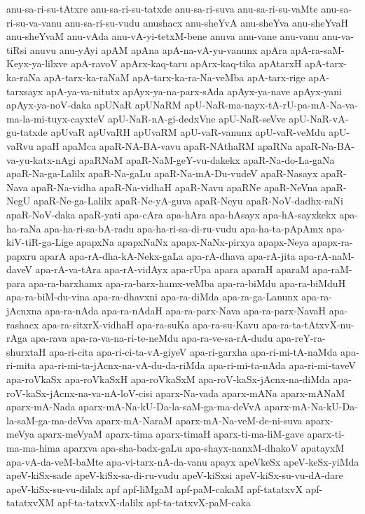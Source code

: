 {anu-sa-ri-su-tAtxre
anu-sa-ri-su-tatxde
anu-sa-ri-suva
anu-sa-ri-su-vaMte
anu-sa-ri-su-va-vanu
anu-sa-ri-su-vudu
anushacx
anu-sheYvA
anu-sheYva
anu-sheYvaH
anu-sheYvaM
anu-vAda
anu-vA-yi-tetxM-bene
anuva
anu-vane
anu-vanu
anu-va-tiRsi
anuvu
anu-yAyi
apAM
apAna
apA-na-vA-yu-vanunx
apAra
apA-ra-saM-Keyx-ya-lilxve
apA-ravoV
apArx-kaq-taru
apArx-kaq-tika
apAtarxH
apA-tarx-ka-raNa
apA-tarx-ka-raNaM
apA-tarx-ka-ra-Na-veMba
apA-tarx-rige
apA-tarxsayx
apA-ya-va-nitutx
apAyx-ya-na-parx-sAda
apAyx-ya-nave
apAyx-yani
apAyx-ya-noV-daka
apUNaR
apUNaRM
apU-NaR-ma-nayx-tA-rU-pa-mA-Na-va-ma-la-mi-tuyx-cayxteV
apU-NaR-nA-gi-dedxVne
apU-NaR-seVve
apU-NaR-vA-gu-tatxde
apUvaR
apUvaRH
apUvaRM
apU-vaR-vanunx
apU-vaR-veMdu
apU-vaRvu
apaH
apaMca
apaR-NA-BA-vavu
apaR-NAthaRM
apaRNa
apaR-Na-BA-va-yu-katx-nAgi
apaRNaM
apaR-NaM-geY-vu-dakekx
apaR-Na-do-La-gaNa
apaR-Na-ga-Lalilx
apaR-Na-gaLu
apaR-Na-mA-Du-vudeV
apaR-Nasayx
apaR-Nava
apaR-Na-vidha
apaR-Na-vidhaH
apaR-Navu
apaRNe
apaR-NeVna
apaR-NegU
apaR-Ne-ga-Lalilx
apaR-Ne-yA-guva
apaR-Neyu
apaR-NoV-dadhx-raNi
apaR-NoV-daka
apaR-yati
apa-cAra
apa-hAra
apa-hAsayx
apa-hA-sayxkekx
apa-ha-raNa
apa-ha-ri-sa-bA-radu
apa-ha-ri-sa-di-ru-vudu
apa-ha-ta-pApAmx
apa-kiV-tiR-ga-Lige
apapxNa
apapxNaNx
apapx-NaNx-pirxya
apapx-Neya
apapx-ra-papxru
aparA
apa-rA-dha-kA-Nekx-gaLa
apa-rA-dhava
apa-rA-jita
apa-rA-naM-daveV
apa-rA-va-tAra
apa-rA-vidAyx
apa-rUpa
apara
aparaH
aparaM
apa-raM-para
apa-ra-barxhamx
apa-ra-barx-hamx-veMba
apa-ra-biMdu
apa-ra-biMduH
apa-ra-biM-du-vina
apa-ra-dhavxni
apa-ra-diMda
apa-ra-ga-Lanunx
apa-ra-jAcnxna
apa-ra-nAda
apa-ra-nAdaH
apa-ra-parx-Nava
apa-ra-parx-NavaH
apa-rashacx
apa-ra-sitxrX-vidhaH
apa-ra-suKa
apa-ra-su-Kavu
apa-ra-ta-tAtxvX-nu-rAga
apa-rava
apa-ra-va-na-ri-te-neMdu
apa-ra-ve-sa-rA-dudu
apa-reY-ra-shurxtaH
apa-ri-cita
apa-ri-ci-ta-vA-giyeV
apa-ri-garxha
apa-ri-mi-tA-naMda
apa-ri-mita
apa-ri-mi-ta-jAcnx-na-vA-du-da-riMda
apa-ri-mi-ta-nAda
apa-ri-mi-taveV
apa-roVkaSx
apa-roVkaSxH
apa-roVkaSxM
apa-roV-kaSx-jAcnx-na-diMda
apa-roV-kaSx-jAcnx-na-va-nA-loV-cisi
aparx-Na-vada
aparx-mANa
aparx-mANaM
aparx-mA-Nada
aparx-mA-Na-kU-Da-la-saM-ga-ma-deVvA
aparx-mA-Na-kU-Da-la-saM-ga-ma-deVva
aparx-mA-NaraM
aparx-mA-Na-veM-de-ni-suva
aparx-meVya
aparx-meVyaM
aparx-tima
aparx-timaH
aparx-ti-ma-liM-gave
aparx-ti-ma-ma-hima
aparxva
apa-sha-badx-gaLu
apa-shayx-nanxM-dhakoV
apatayxM
apa-vA-da-veM-baMte
apa-vi-tarx-nA-da-vanu
apayx
apeVkeSx
apeV-keSx-yiMda
apeV-kiSx-sade
apeV-kiSx-sa-di-ru-vudu
apeV-kiSxsi
apeV-kiSx-su-vu-dA-dare
apeV-kiSx-su-vu-dilalx
apf
apf-liMgaM
apf-paM-cakaM
apf-tatatxvX
apf-tatatxvXM
apf-ta-tatxvX-dalilx
apf-ta-tatxvX-paM-caka
}
